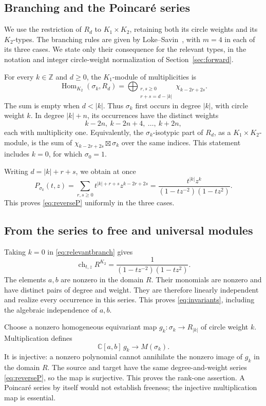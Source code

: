 \documentclass[11pt]{article}
\newcommand{\C}{\mathbb C}
\newcommand{\Z}{\mathbb Z}
\newcommand{\Hom}{\operatorname{Hom}}
\newcommand{\ch}{\operatorname{ch}}
\theoremstyle{definition}
\numberwithin{equation}{section}
\begin{document}
\subsection{Branching and the Poincar\'e series}
We use the restriction of $R_d$ to $K_1\times K_2$, retaining both
its circle weights and its $K_2$-types. The branching rules are given
by Loke--Savin~\cite[Proposition~5.1]{LS19}, with $m=4$ in each
of its three cases. We state only their consequence for the relevant
types, in the notation and integer circle-weight normalization of
Section~\ref{sec:forward}.

For every $k\in\Z$ and $d\geq0$, the $K_1$-module of multiplicities is
\begin{equation}\label{eq:relevantbranch}
 \Hom_{K_2}(\sigma_k,R_d)
   =\bigoplus_{\substack{r,s\geq0\\r+s=d-|k|}}
       \chi_{k-2r+2s}.
\end{equation}
The sum is empty when $d<|k|$. Thus $\sigma_k$ first occurs in degree
$|k|$, with circle weight $k$. In degree $|k|+n$, its occurrences
have the distinct weights
\[
 k-2n,\ k-2n+4,\ \ldots,\ k+2n,
\]
each with multiplicity one. Equivalently, the
$\sigma_k$-isotypic part of $R_d$, as a $K_1\times K_2$-module,
is the sum of $\chi_{k-2r+2s}\boxtimes\sigma_k$ over the same indices.
This statement includes $k=0$, for which $\sigma_0=1$.

Writing $d=|k|+r+s$, we obtain at once
\[
 P_{\sigma_k}(t,z)
 =\sum_{r,s\geq0}t^{|k|+r+s}z^{k-2r+2s}
 =\frac{t^{|k|}z^k}{(1-tz^{-2})(1-tz^2)}.
\]
This proves \eqref{eq:reverseP} uniformly in the three cases.

\subsection{From the series to free and universal modules}
Taking $k=0$ in \eqref{eq:relevantbranch} gives
\[
 \ch_{t,z}R^{K_2}=\frac1{(1-tz^{-2})(1-tz^2)}.
\]
The elements $a,b$ are nonzero in the domain $R$. Their monomials are
nonzero and have distinct pairs of degree and weight. They are therefore
linearly independent and realize every occurrence in this series.
This proves \eqref{eq:invariants}, including the algebraic independence
of $a,b$.

Choose a nonzero homogeneous equivariant map
$g_k:\sigma_k\to R_{|k|}$ of circle weight $k$.
Multiplication defines
\[
 \C[a,b]\,g_k\longrightarrow M(\sigma_k).
\]
It is injective: a nonzero polynomial cannot annihilate the nonzero
image of $g_k$ in the domain $R$. The source and target have the same
degree-and-weight series \eqref{eq:reverseP}, so the map is surjective.
This proves the rank-one assertion. A Poincar\'e series by itself would
not establish freeness; the injective multiplication map is essential.
\end{document}

